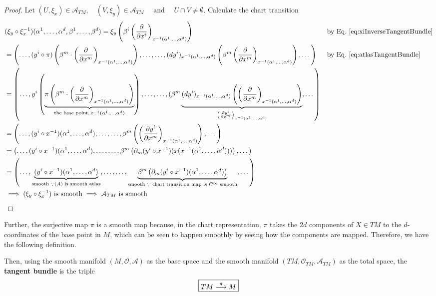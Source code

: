 \begin{proof}
Let $(U,\xi_x) \in \mathcal{A}_{TM}, \quad (V,\xi_y) \in \mathcal{A}_{TM} \quad \text{ and } \quad U \cap V \ne \emptyset$. Calculate the chart transition
\begin{align*}
& (\xi_y \after \xi_x^{-1})(\alpha^1, \dotsc, \alpha^d, \beta^1, \dotsc, \beta^d) = \xi_y \left(\beta^i \left(\cibasis{x^i} \right)_{x^{-1}(\alpha^1, \dotsc, \alpha^d)}\right) && \text{by Eq.~\ref{eq:xiInverseTangentBundle}} \\
& = \left(\dotsc, (y^i \after \pi)\left(\beta^m \cdot \left(\cibasis{x^m}\right)_{x^{-1}(\alpha^1, \dotsc, \alpha^d)}\right), \dotsc, \dotsc, (dy^i)_{x^{-1}(\alpha^1, \dotsc, \alpha^d)} \left(\beta^m \left(\cibasis{x^m} \right)_{x^{-1}(\alpha^1, \dotsc, \alpha^d)} \right), \dotsc \right) && \text{by Eq.~\ref{eq:atlasTangentBundle}}  \\
& = \left(\dotsc, y^i \left(\underbrace{\pi\left(\beta^m \cdot \left(\cibasis{x^m}\right)_{x^{-1}(\alpha^1, \dotsc, \alpha^d)}\right)}_{\text{the base point,}\, x^{-1}(\alpha^1, \dotsc, \alpha^d)}\right), \dotsc, \dotsc, (\beta^m \underbrace{(dy^i)_{x^{-1} (\alpha^1, \dotsc, \alpha^d)} \left( \left(\cibasis{x^m}\right)_{x^{-1}(\alpha^1, \dotsc, \alpha^d)} \right)}_{\left(\cibasis[y^i]{x^m}\right)_{x^{-1}(\alpha^1, \dotsc, \alpha^d)}}, \dotsc \right) \\
& = \left(\dotsc, (y^i \after x^{-1})(\alpha^1, \dotsc, \alpha^d), \dotsc, \dotsc, \beta^m \left(\left(\cibasis[y^i]{x^m}\right)_{x^{-1}(\alpha^1, \dotsc, \alpha^d)} \right), \dotsc\right) \\
& = \left(\dotsc, (y^i \after x^{-1})(\alpha^1, \dotsc, \alpha^d), \dotsc, \dotsc, \beta^m \left(\partial_m (y^i \after x^{-1})( x (x^{-1}(\alpha^1, \dotsc, \alpha^d))) \right), \dotsc\right) \\
& = \left(\dotsc, \underbrace{(y^i \after x^{-1})(\alpha^1, \dotsc, \alpha^d)}_{\text{smooth } \because \mathcal(A) \text{ is smooth atlas}}, \dotsc, \dotsc, \underbrace{\beta^m \left(\partial_m (y^i \after x^{-1})(\alpha^1, \dotsc, \alpha^d)\right)}_{\text{smooth } \because \text{ chart transition map is } C^\infty \text{ smooth}}, \dotsc\right) \\
& \implies (\xi_y \after \xi_x^{-1}) \text{ is smooth} \implies \mathcal{A}_{TM} \text{ is smooth}
\end{align*}
\end{proof}

Further, the surjective map $\pi$ is a smooth map because, in the chart representation, $\pi$ takes the $2d$ components of $X \in TM$ to the $d$-coordinates of the base point in $M$, which can be seen to happen smoothly by seeing how the components are mapped. Therefore, we have the following definition. 
\begin{definition}
Then, using the smooth manifold $(M, \mathcal{O}, \mathcal{A})$ as the base space and the smooth manifold $(TM, \mathcal{O}_{TM}, \mathcal{A}_{TM})$ as the total space, the \textbf{tangent bundle} is the triple
\begin{equation}\label{eq:TangentBundle}
\boxed{TM \projmapto M}
\end{equation}
\end{definition}

